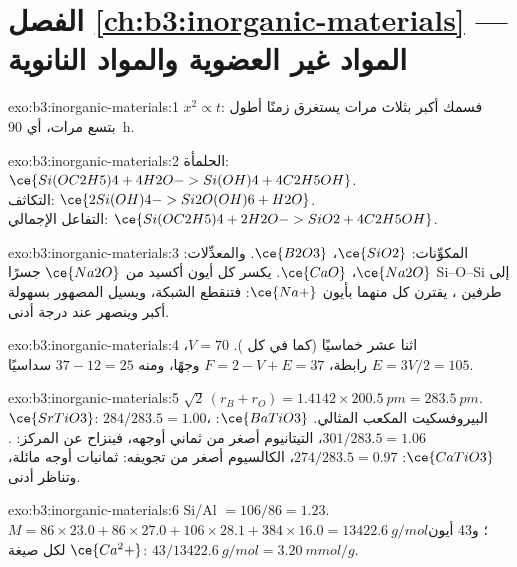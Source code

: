 \section*{الفصل \ref{ch:b3:inorganic-materials} --- المواد غير العضوية والمواد النانوية}

\begin{solution}{exo:b3:inorganic-materials:1}
$x^2 \propto t$: فسمك أكبر بثلاث مرات يستغرق زمنًا أطول بتسع مرات، أي \qty{90}{h}.
\end{solution}

\begin{solution}{exo:b3:inorganic-materials:2}
الحلمأة: $\ce{Si(OC2H5)4 + 4H2O -> Si(OH)4 + 4C2H5OH}$.\\
التكاثف: $\ce{2Si(OH)4 -> Si2O(OH)6 + H2O}$.\\
التفاعل الإجمالي: $\ce{Si(OC2H5)4 + 2H2O -> SiO2 + 4C2H5OH}$.
\end{solution}

\begin{solution}{exo:b3:inorganic-materials:3}
المكوِّنات: $\ce{SiO2}$، $\ce{B2O3}$. والمعدِّلات: $\ce{Na2O}$، $\ce{CaO}$. يكسر كل أيون أكسيد من $\ce{Na2O}$ جسرًا Si--O--Si
إلى طرفين ، يقترن كل منهما بأيون $\ce{Na+}$: فتنقطع الشبكة، ويسيل المصهور
بسهولة أكبر وينصهر عند درجة أدنى.
\end{solution}

\begin{solution}{exo:b3:inorganic-materials:4}
اثنا عشر خماسيًا (كما في كل ). $V = 70$، $E = 3V/2 = 105$ رابطة، $F = 2 - V + E = 37$
وجهًا، ومنه $37 - 12 = 25$ سداسيًا.
\end{solution}

\begin{solution}{exo:b3:inorganic-materials:5}
$\sqrt2\,(r_B + r_O) = 1.4142 \times \qty{200.5}{pm} = \qty{283.5}{pm}$. $\ce{SrTiO3}$: $284/283.5 = 1.00$، البيروفسكيت المكعب المثالي.
$\ce{BaTiO3}$: $301/283.5 = 1.06$، التيتانيوم أصغر من ثماني أوجهه، فينزاح عن المركز: .
$\ce{CaTiO3}$: $274/283.5 = 0.97$، الكالسيوم أصغر من تجويفه: ثمانيات أوجه مائلة، وتناظر
أدنى.
\end{solution}

\begin{solution}{exo:b3:inorganic-materials:6}
Si/Al $= 106/86 = 1.23$. $M = 86 \times 23.0 + 86 \times 27.0 + 106 \times 28.1 + 384 \times 16.0 = \qty{13422.6}{g/mol}$؛ و43 أيون $\ce{Ca^2+}$ لكل
صيغة: $43/\qty{13422.6}{g/mol} = \qty{3.20}{mmol/g}$.
\end{solution}

